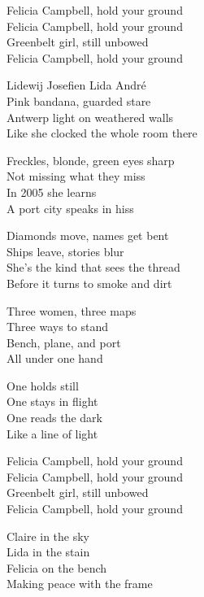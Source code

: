 \begin{lyrics}
Felicia Campbell, hold your ground\\
Felicia Campbell, hold your ground\\
Greenbelt girl, still unbowed\\
Felicia Campbell, hold your ground

Lidewij Josefien Lida André\\
Pink bandana, guarded stare\\
Antwerp light on weathered walls\\
Like she clocked the whole room there

Freckles, blonde, green eyes sharp\\
Not missing what they miss\\
In 2005 she learns\\
A port city speaks in hiss

Diamonds move, names get bent\\
Ships leave, stories blur\\
She’s the kind that sees the thread\\
Before it turns to smoke and dirt

Three women, three maps\\
Three ways to stand\\
Bench, plane, and port\\
All under one hand

One holds still\\
One stays in flight\\
One reads the dark\\
Like a line of light

Felicia Campbell, hold your ground\\
Felicia Campbell, hold your ground\\
Greenbelt girl, still unbowed\\
Felicia Campbell, hold your ground

Claire in the sky\\
Lida in the stain\\
Felicia on the bench\\
Making peace with the frame
\end{lyrics}

